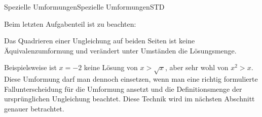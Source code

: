 \begin{MXContent}{Spezielle Umformungen}{Spezielle Umformungen}{STD}
\begin{MExercise}
\end{MExercise}

Beim letzten Aufgabenteil ist zu beachten:

\begin{MInfo}
Das Quadrieren einer Ungleichung auf beiden Seiten ist keine Äquivalenzumformung und verändert unter Umständen die Lösungsmenge.
\end{MInfo}

Beispielsweise ist $x=-2$ keine Lösung von $x>\sqrt{x}$, aber sehr wohl von $x^2>x$. Diese Umformung darf man dennoch einsetzen, wenn man eine richtig formulierte Fallunterscheidung für die Umformung ansetzt und
die Definitionsmenge der ursprünglichen Ungleichung beachtet. Diese Technik wird im nächsten Abschnitt genauer betrachtet.

\end{MXContent}


